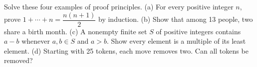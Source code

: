 Solve these four examples of proof principles. (a) For every positive integer $n$, prove $1+\cdots+n=\dfrac{n(n+1)}{2}$ by induction. (b) Show that among 13 people, two share a birth month. (c) A nonempty finite set $S$ of positive integers contains $a-b$ whenever $a,b\in S$ and $a>b$. Show every element is a multiple of its least element. (d) Starting with 25 tokens, each move removes two. Can all tokens be removed?
